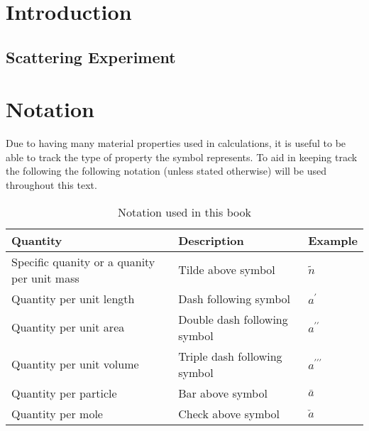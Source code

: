 \documentclass[a4paper,12pt]{book}
\begin{document}

\frontmatter
\tableofcontents
\listoftables
\listoffigures
\clearpage

\mainmatter
\chapter{Introduction}
\section{Scattering Experiment}

\clearpage
\appendix
\chapter{Notation}
Due to having many material properties used in calculations, it is useful to be able to track the type of property the symbol represents. To aid in keeping track the following the following notation (unless stated otherwise) will be used throughout this text.
\begin{table}[h]
  \centering
\begin{tabular}{ p{5cm} | p{5cm} | l }
  Quantity & Description & Example \\
  \hline
  Specific quanity or a quanity per unit mass & Tilde above symbol & $\tilde{n}$ \\
  Quantity per unit length & Dash following symbol & $a^{\prime}$ \\
  Quantity per unit area & Double dash following symbol & $a^{\prime\prime}$ \\
  Quantity per unit volume & Triple dash following symbol & $a^{\prime\prime\prime}$ \\
  Quantity per particle & Bar above symbol & $\bar{a}$ \\
  Quantity per mole & Check above symbol & $\check{a}$ \\
\end{tabular}
\caption{Notation used in this book} \label{table:notation}
\end{table}
\clearpage
{}
\printindex
\end{document}
